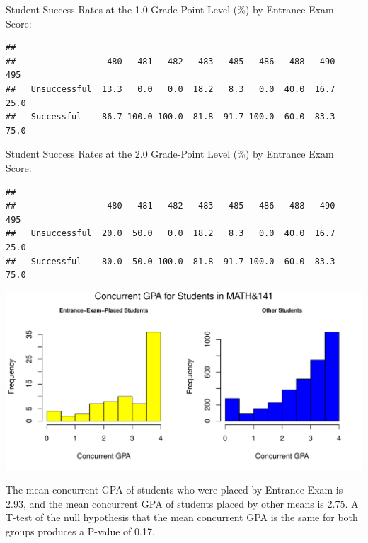 \documentclass[twoside]{article}\usepackage[]{graphicx}\usepackage[]{color}
\makeatletter
\def\maxwidth{ %
  \ifdim\Gin@nat@width>\linewidth
    \linewidth
  \else
    \Gin@nat@width
  \fi
}
\newenvironment{kframe}{%
 \def\at@end@of@kframe{}%
 \ifinner\ifhmode%
  \def\at@end@of@kframe{\end{minipage}}%
  \begin{minipage}{\columnwidth}%
 \fi\fi%
 \def\FrameCommand##1{\hskip\@totalleftmargin \hskip-\fboxsep
 \colorbox{shadecolor}{##1}\hskip-\fboxsep
     \hskip-\linewidth \hskip-\@totalleftmargin \hskip\columnwidth}%
 \MakeFramed {\advance\hsize-\width
   \@totalleftmargin\z@ \linewidth\hsize
   \@setminipage}}%
 {\par\unskip\endMakeFramed%
 \at@end@of@kframe}
\newenvironment{knitrout}{}{} %
\makeatother
\begin{document}
Student Success Rates  at the 1.0 Grade-Point Level (\%) by Entrance Exam Score:

\begin{knitrout}
\color{fgcolor}\begin{kframe}
\begin{verbatim}
##               
##                  480   481   482   483   485   486   488   490   495
##   Unsuccessful  13.3   0.0   0.0  18.2   8.3   0.0  40.0  16.7  25.0
##   Successful    86.7 100.0 100.0  81.8  91.7 100.0  60.0  83.3  75.0
\end{verbatim}
\end{kframe}
\end{knitrout}


Student Success Rates  at the 2.0 Grade-Point Level (\%) by Entrance Exam Score:

\begin{knitrout}
\color{fgcolor}\begin{kframe}
\begin{verbatim}
##               
##                  480   481   482   483   485   486   488   490   495
##   Unsuccessful  20.0  50.0   0.0  18.2   8.3   0.0  40.0  16.7  25.0
##   Successful    80.0  50.0 100.0  81.8  91.7 100.0  60.0  83.3  75.0
\end{verbatim}
\end{kframe}
\end{knitrout}


\begin{knitrout}
\color{fgcolor}
\includegraphics[width=\maxwidth]{figure/GPAgraphs141-1} 

\end{knitrout}

The mean concurrent GPA of students who were placed by Entrance Exam is 2.93, and the mean concurrent GPA of students placed by other means is 2.75.  A T-test of the null hypothesis that the mean concurrent GPA is the same for both groups produces a P-value of 0.17.
\end{document}
